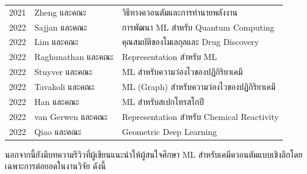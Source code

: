 \begin{table}[H]
\begin{tabular}{cll}
    2021 &Zheng และคณะ\autocite{zheng2021} &วิธีทางควอนตัมและการทำนายพลังงาน \\
    2022 &Sajjan และคณะ\autocite{sajjan2022} &การพัฒนา ML สำหรับ Quantum Computing \\
    2022 &Lim และคณะ\autocite{lim2022} &คุณสมบัติของโมเลกุลและ Drug Discovery \\
    2022 &Raghunathan และคณะ\autocite{raghunathan2022} &Representation สำหรับ ML \\
    2022 &Stuyver และคณะ\autocite{stuyver2022} &ML สำหรับความว่องไวของปฏิกิริยาเคมี \\
    2022 &Tavakoli และคณะ\autocite{tavakoli2022} &ML (Graph) สำหรับความว่องไวของปฏิกิริยาเคมี \\
    2022 &Han และคณะ\autocite{han2022} &ML สำหรับสเปกโทรสโกปี \\
    2022 &van Gerwen และคณะ\autocite{gerwen2022} &Representation สำหรับ Chemical Reactivity \\
    2022 &Qiao และคณะ\autocite{qiao2022} &Geometric Deep Learning \\
    \bottomrule
    \end{tabular}
\end{table}

นอกจากนี้ยังมีบทความรีวิวที่ผู้เขียนแนะนำให้ผู้สนใจศึกษา ML สำหรับเคมีควอนตัมแบบเชิงลึกโดยเฉพาะการต่อยอดในงานวิจัย ดังนี้


